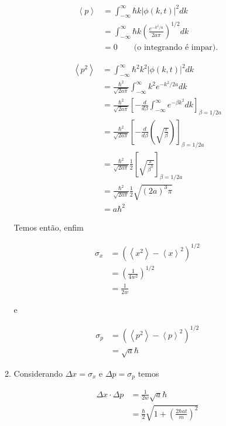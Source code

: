 \documentclass[a4paper, 12pt, notitlepage]{article}
\begin{document}
\begin{enumerate}
\begin{enumerate}
  \begin{align*}
  \left\langle p \right \rangle &= \int_{-\infty}^{\infty} \hbar k |\phi(k, t)|^2 dk \\
  &= \int_{-\infty}^{\infty} \hbar k \left(\frac{e^{-k^2/a}}{2a \pi}\right)^{1/2} dk \\
  &= 0 \qquad \text{(o integrando é impar).}
  \end{align*}
  
  \begin{align*}
  \left\langle p^2 \right \rangle &= \int_{-\infty}^{\infty} \hbar^2 k^2 |\phi(k, t)|^2 dk \\
  &= \frac{\hbar^2}{\sqrt{2a\pi}} \int_{-\infty}^{\infty} k^2 e^{-k^2/2a} dk \\
  &= \frac{\hbar^2}{\sqrt{2a\pi}} \left[-\frac{d}{d\beta}\int_{-\infty}^{\infty} e^{-\beta k^2} dk \right]_{\beta = 1/2a} \\
  &= \frac{\hbar^2}{\sqrt{2a\pi}} \left[- \frac{d}{d\beta} \left(\sqrt{\frac{\pi}{\beta}}\right) \right]_{\beta = 1/2a} \\
  &= \frac{\hbar^2}{\sqrt{2a\pi}} \frac{1}{2} \left[\sqrt{\frac{\pi}{\beta^{3}}}\right]_{\beta = 1/2a} \\
  &= \frac{\hbar^2}{\sqrt{2a\pi}} \frac{1}{2} \sqrt{(2a)^3\pi} \\
  &= a\hbar^2
  \end{align*}
  
  Temos então, enfim
  
  \begin{align*}
  \sigma_x &= \left(\left\langle x^2 \right\rangle - \left\langle x \right\rangle^2\right)^{1/2} \\
  &= \left(\frac{1}{4w^2}\right)^{1/2} \\
  &= \frac{1}{2w}
  \end{align*}
  
  e
  
  \begin{align*}
  \sigma_p &= \left(\left\langle p^2 \right\rangle - \left\langle p \right\rangle^2 \right)^{1/2} \\
  &= \sqrt{a} \hbar
  \end{align*}
  
  \item Considerando $\Delta x = \sigma_x$ e $\Delta p = \sigma_p$ temos
  
  \begin{align*}
  \Delta x \cdot \Delta p &= \frac{1}{2w} \sqrt{a} \hbar \\
  &= \frac{\hbar}{2} \sqrt{1 + \left(\frac{2 \hbar a t}{m}\right)^2}
  \end{align*}
  

\end{enumerate}
\end{enumerate}
\end{document}
